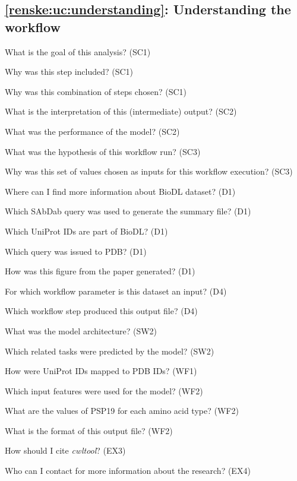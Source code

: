 \subsection{\ref{renske:uc:understanding}: Understanding the workflow}
\begin{provquestions}[resume]
    \item What is the goal of this analysis? (SC1)  
    \item Why was this step included? (SC1)
    \item Why was this combination of steps chosen? (SC1)
    \item What is the interpretation of this (intermediate) output?  (SC2)
    \item What was the performance of the model? (SC2)
    \item What was the hypothesis of this workflow run? (SC3)
    \item Why was this set of values chosen as inputs for this workflow execution? (SC3)
    \item Where can I find more information about BioDL dataset? (D1)
    \item Which SAbDab query was used to generate the summary file? (D1)
    \item Which UniProt IDs are part of BioDL? (D1)
    \item Which query was issued to PDB? (D1)
    \item How was this figure from the paper generated? (D1)
    \item For which workflow parameter is this dataset an input? (D4)
    \item Which workflow step produced this output file? (D4)
    \item What was the model architecture? (SW2)
    \item Which related tasks were predicted by the model? (SW2)
    \item How were UniProt IDs mapped to PDB IDs? (WF1)
    \item Which input features were used for the model? (WF2)
    \item What are the values of PSP19 for each amino acid type? (WF2)
    \item What is the format of this output file? (WF2)
    \item How should I cite \emph{cwltool}? (EX3)
    \item Who can I contact for more information about the research? (EX4)
\end{provquestions}

